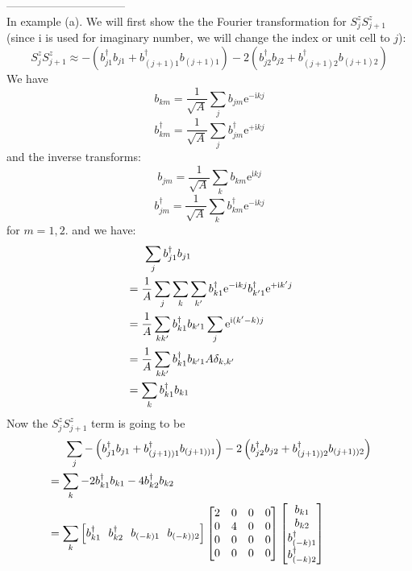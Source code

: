 \documentclass[letter]{article}
\newcommand{\e}{\mathrm{e}}
\newcommand{\ii}{\mathrm{i}}
\begin{document}
--------------------------------\\
In example (a). We will first show the the Fourier transformation for $S_j^z S_{j+1}^z$(since i is used for imaginary number, we will change the index or unit cell to $j$):\\
$$S_{j}^z S_{j+1}^z \approx-\left(b_{j1}^{\dagger}b_{j1}+b_{(j+1)1}^{\dagger}b_{(j+1)1}\right)-2\left(b_{j2}^{\dagger}b_{j2}+b_{(j+1)2}^{\dagger}b_{(j+1)2}\right)$$
We have $$
b_{km}=\frac{1}{\sqrt{A}}\sum_{j}b_{jm}\e^{-\ii k j}
$$$$
b^{\dagger}_{km}=\frac{1}{\sqrt{A}}\sum_{j}b_{jm}^{\dagger}\e^{+\ii k j}
$$
and the inverse transforms:$$
b_{jm}=\frac{1}{\sqrt{A}}\sum_{k}b_{km}\e^{\ii k j}
$$$$
b^{\dagger}_{jm}=\frac{1}{\sqrt{A}}\sum_{k}b_{km}^{\dagger}\e^{-\ii k j}
$$
for $m=1,2$. and we have:
$$\begin{aligned}
&\indent \sum_j b_{j1}^{\dagger}b_{j1} \\
&=\frac{1}{A}\sum_{j}\sum_{k}\sum_{k'}b_{k1}^{\dagger}\e^{-\ii kj}b_{k'1}^{\dagger}\e^{+\ii k'j}\\
&=\frac{1}{A}\sum_{kk'}b_{k1}^{\dagger}b_{k'1}\sum_{j}\e^{\ii(k'-k)j}\\
&=\frac{1}{A}\sum_{kk'}b_{k1}^{\dagger}b_{k'1} A \delta_{k,k'}\\
&=\sum_{k}b_{k1}^{\dagger}b_{k1}
\end{aligned}
$$
Now the $S_j^z S_{j+1}^z$ term is going to be$$\begin{aligned}
& \indent \sum_j -\left(b_{j1}^{\dagger}b_{j1}+b_{(j+1))1}^{\dagger}b_{(j+1))1}\right)-2\left(b_{j2}^{\dagger}b_{j2}+b_{(j+1))2}^{\dagger}b_{(j+1))2}\right)\\
&= \sum_{k}-2b_{k1}^{\dagger}b_{k1}-4b_{k2}^{\dagger}b_{k2}\\
&=\sum_k \left[
    b_{k1}^{\dagger} \ \ 
    b_{k2}^{\dagger}\  \ 
    b_{(-k)1}\ \ 
    b_{(-k))2}\right]
   \begin{bmatrix}
        2 & 0 & 0 & 0 \\
       0 &  4 & 0 &0 \\
       0 &  0 & 0 &0\\
        0 & 0 & 0& 0
        \end{bmatrix}\begin{bmatrix}
            b_{k1}  \\
            b_{k2}  \\
            b_{(-k)1}^{\dagger}\\
            b_{(-k)2}^{\dagger}
            \end{bmatrix}
\end{aligned}
$$
\end{document}
